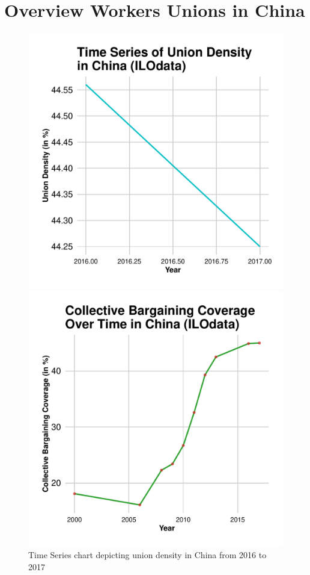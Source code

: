 \documentclass[11pt]{article}\usepackage[]{graphicx}\usepackage[]{xcolor}
\newenvironment{knitrout}{}{} %
\begin{document}
\section{Overview Workers Unions in China}
\begin{figure}[h!]
  \centering
  \begin{minipage}{0.48\linewidth}
\begin{knitrout}
\color{fgcolor}

{\centering \includegraphics[width=0.7\linewidth]{figure/Chinatradeuniondensity-1} 

}


\end{knitrout}
    \caption{Time Series chart depicting union density in China from 2016 to 2017}
    \label{fig:union-density-china}
  \end{minipage}
  \hfill %
  \begin{minipage}{0.48\linewidth}
\begin{knitrout}
\color{fgcolor}

{\centering \includegraphics[width=0.7\linewidth]{figure/ChinaCollectiveBargaining-1} 

}
\end{knitrout}
\end{minipage}
\end{figure}
\end{document}
